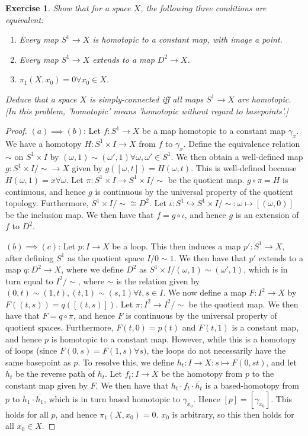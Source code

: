 \documentclass{article}
\newtheorem{exercise}{Exercise}[subsection]
\begin{document}
\begin{exercise}
Show that for a space $X$, the following three conditions are equivalent:
\begin{enumerate}
    \item[(a)] Every map $S^1\to X$ is homotopic to a constant map, with image a point.
    \item[(b)] Every map $S^1\to X$ extends to a map $D^2\to X$.
    \item[(c)] $\pi_1(X,x_0)=0\forall x_0\in X$.
\end{enumerate}
Deduce that a space $X$ is simply-connected iff all maps $S^1\to X$ are homotopic. [In this problem, 'homotopic' means 'homotopic without regard to basepoints'.]
\end{exercise}
\begin{proof}
$(a)\implies (b)$: Let $f:S^1\to X$ be a map homotopic to a constant map $\gamma_x$. We have a homotopy $H:S^1\times I\to X$ from $f$ to $\gamma_x$. Define the equivalence relation $\sim$ on $S^1\times I$ by $(\omega,1)\sim(\omega',1)\forall \omega,\omega'\in S^1$. We then obtain a well-defined map $g:S^1\times I/\sim\to X$ given by $g([\omega,t])=H(\omega,t)$. This is well-defined because $H(\omega,1)=x\forall \omega$. Let $\pi:S^1\times I\to S^1\times I/\sim$ be the quotient map. $g\circ\pi= H$ is continuous, and hence $g$ is continuous by the universal property of the quotient topology. Furthermore, $S^1\times I/\sim\cong D^2$. Let $\iota:S^1\hookrightarrow S^1\times I/\sim :\omega\mapsto[(\omega,0)]$ be the inclusion map. We then have that $f=g\circ \iota$, and hence $g$ is an extension of $f$ to $D^2$.

$(b)\implies (c)$: Let $p:I\to X$ be a loop. This then induces a map $p':S^1\to X$, after defining $S^1$ as the quotient space $I/0\sim 1$. We then have that $p'$ extends to a map $q:D^2\to X$, where we define $D^2$ as $S^1\times I/(\omega,1)\sim(\omega',1)$, which is in turn equal to $I^2/\sim$, where $\sim$ is the relation given by $(0,t)\sim(1,t),(t,1)\sim(s,1)\forall t,s\in I$. We now define a map $F:I^2\to X$ by $F((t,s))=q([(t,s)])$. Let $\pi:I^2\to I^2/\sim$ be the quotient map. We then have that $F=q\circ\pi$, and hence $F$ is continuous by the universal property of quotient spaces. Furthermore, $F(t,0)=p(t)$ and $F(t,1)$ is a constant map, and hence $p$ is homotopic to a constant map. However, while this is a homotopy of loops (since $F(0,s)=F(1,s)\forall s)$, the loops do not necessarily have the same basepoint as $p$. To resolve this, we define $h_t:I\to X:s\mapsto F(0,st)$, and let $\overline{h_t}$ be the reverse path of $h_t$. Let $f_t:I\to X$ be the homotopy from $p$ to the constant map given by $F$. We then have that $h_t\cdot f_t\cdot \overline{h_t}$ is a based-homotopy from $p$ to $h_1\cdot\overline{h_1}$, which is in turn based homotopic to $\gamma_{x_0}$. Hence $[p]=[\gamma_{x_0}]$. This holds for all $p$, and hence $\pi_1(X,x_0)=0$. $x_0$ is arbitrary, so this then holds for all $x_0\in X$.


\end{proof}
\end{document}
